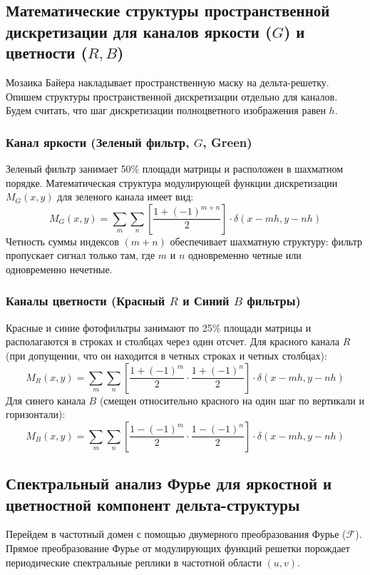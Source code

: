 \documentclass[12pt,a4paper]{article}
\begin{document}
\subsection{Математические структуры пространственной дискретизации для каналов яркости ($G$) и цветности ($R, B$)}
Мозаика Байера накладывает пространственную маску на дельта-решетку. Опишем структуры пространственной дискретизации отдельно для каналов. Будем считать, что шаг дискретизации полноцветного изображения равен $h$.

\subsubsection{Канал яркости (Зеленый фильтр, $G$, Green)}
Зеленый фильтр занимает 50\% площади матрицы и расположен в шахматном порядке. Математическая структура модулирующей функции дискретизации $M_G(x,y)$ для зеленого канала имеет вид:
\begin{equation}
    M_G(x, y) = \sum_{m} \sum_{n} \left[ \frac{1 + (-1)^{m+n}}{2} \right] \cdot \delta(x - mh, y - nh)
\end{equation}
Четность суммы индексов $(m+n)$ обеспечивает шахматную структуру: фильтр пропускает сигнал только там, где $m$ и $n$ одновременно четные или одновременно нечетные.

\subsubsection{Каналы цветности (Красный $R$ и Синий $B$ фильтры)}
Красные и синие фотофильтры занимают по 25\% площади матрицы и располагаются в строках и столбцах через один отсчет.
Для красного канала $R$ (при допущении, что он находится в четных строках и четных столбцах):
\begin{equation}
    M_R(x, y) = \sum_{m} \sum_{n} \left[ \frac{1 + (-1)^m}{2} \cdot \frac{1 + (-1)^n}{2} \right] \cdot \delta(x - mh, y - nh)
\end{equation}
Для синего канала $B$ (смещен относительно красного на один шаг по вертикали и горизонтали):
\begin{equation}
    M_B(x, y) = \sum_{m} \sum_{n} \left[ \frac{1 - (-1)^m}{2} \cdot \frac{1 - (-1)^n}{2} \right] \cdot \delta(x - mh, y - nh)
\end{equation}

\subsection{Спектральный анализ Фурье для яркостной и цветностной компонент дельта-структуры}
Перейдем в частотный домен с помощью двумерного преобразования Фурье ($\mathcal{F}$). Прямое преобразование Фурье от модулирующих функций решетки порождает периодические спектральные реплики в частотной области $(u, v)$.
\end{document}
